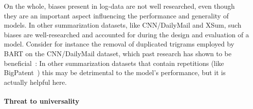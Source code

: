 On the whole, biases present in log-data are not well researched, even though they are an important aspect influencing the performance and generality of models.
In other summarization datasets, like CNN/DailyMail and XSum, such biases are well-researched and accounted for during the design and evaluation of a model.
Consider for instance the removal of duplicated trigrams employed by BART on the CNN/DailyMail dataset,
which past research has shown to be beneficial~\parencites{bart}{beam_search_duplicate_ngram_removal}:
In other summarization datasets that contain repetitions (like BigPatent~\parencite{bigpatent}) this may be detrimental to the model's performance,
but it is actually helpful here.

\paragraph{Threat to universality}

